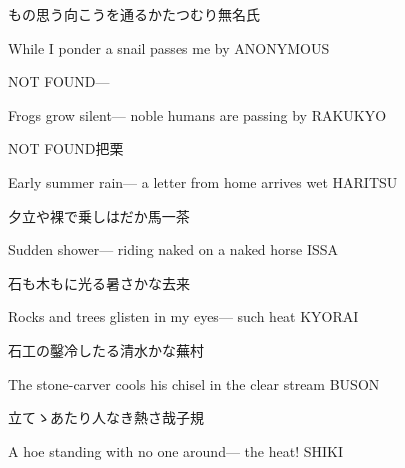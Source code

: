 \begin{haiku}
    {もの思う向こうを通るかたつむり}\hfill{\FH 無名氏}

    \vin{} While I ponder
    \vin{} \vin{} a snail
    \vin{} \vin{} \vin{} passes me by \hspace{\fill} ANONYMOUS
\end{haiku}

\begin{haiku}
   NOT FOUND\hfill{---}

    \vin{} Frogs grow silent---
    \vin{} \vin{} noble humans
    \vin{} \vin{} \vin{} are passing by \hspace{\fill} RAKUKYO
\end{haiku}

\begin{haiku}
    NOT FOUND\hfill{\FH 把栗}

    \vin{} Early summer rain---
    \vin{} \vin{} a letter from home
    \vin{} \vin{} \vin{} arrives wet \hspace{\fill} HARITSU
\end{haiku}

\begin{haiku}
    {\FH 夕立や裸で乗しはだか馬}\hfill{\FH 一茶}

    \vin{} Sudden shower---
    \vin{} \vin{} riding naked
    \vin{} \vin{} \vin{} on a naked horse \hspace{\fill} ISSA
\end{haiku}

\begin{haiku}
    {\FH 石も木もに光る暑さかな}\hfill{\FH 去来}

    \vin{} Rocks and trees
    \vin{} \vin{} glisten in my eyes---
    \vin{} \vin{} \vin{} such heat \hspace{\fill} KYORAI
\end{haiku}

\begin{haiku}
    {\FH 石工の鑿冷したる清水かな}\hfill{\FH 蕪村}

    \vin{} The stone-carver
    \vin{} \vin{} cools his chisel
    \vin{} \vin{} \vin{} in the clear stream \hspace{\fill} BUSON
\end{haiku}

\begin{haiku}
    {\FH {}立てゝあたり人なき熱さ哉}\hfill{\FH 子規}

    \vin{} A hoe standing
    \vin{} \vin{} with no one around---
    \vin{} \vin{} \vin{} the heat! \hspace{\fill} SHIKI
\end{haiku}

